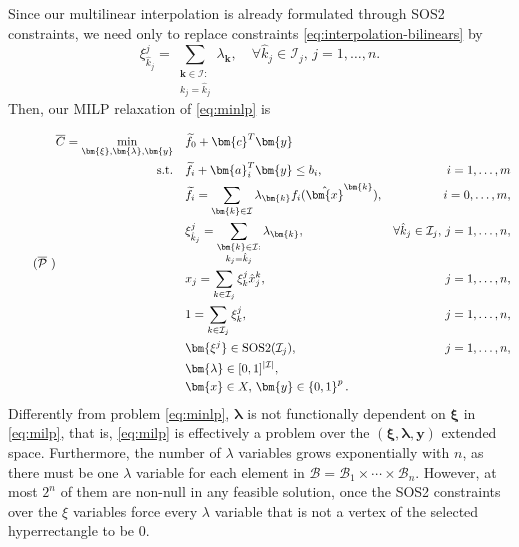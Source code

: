 \documentclass[pdflatex,sn-mathphys-num]{sn-jnl}%
\newcommand{\new}[1]{#1}
\begin{document}
\new{%
Since our multilinear interpolation is already formulated through SOS2 constraints, we need only to replace constraints \eqref{eq:interpolation-bilinears} by
\begin{equation}\label{eq:relaxed-interpolation-bilinears}
     \xi^j_{\hat{k}_j} = \sum_{\substack{\bm{k} \in \mathcal{I}: \\ k_j = \hat{k}_j}} \lambda_{\bm{k}},\quad \forall \hat{k}_j\in \mathcal{I}_j,\, j=1,\ldots,n .
\end{equation}
Then, our MILP relaxation of \ref{eq:minlp} is
}
\begin{equation}\label{eq:milp}\tag{$\overline{\mathcal{P}}$ }
\begin{aligned}
    \overline{C} = \min_{\bm{\xi},\bm{\lambda},\bm{y}} \quad & \widetilde{f}_0 + \bm{c}^{T} \bm{y}  \\
    \textrm{s.t.} \quad & \widetilde{f}_i + \bm{a}_i^{T} \bm{y} \le b_i, & i=1,\ldots,m \\
			& \widetilde{f}_i = \sum_{\bm{k}\in\mathcal{I}} \lambda_{\bm{k}}  f_i(\hat{\bm{x}}^{\bm{k}}), & i=0,\ldots,m, \\
        &\xi^j_{\hat{k}_j} = \sum_{\substack{\bm{k} \in \mathcal{I}: \\ k_j = \hat{k}_j}} \lambda_{\bm{k}},& \forall \hat{k}_j\in \mathcal{I}_j,\, j=1,\ldots,n, \\
   &x_{j} = \sum_{k\in\mathcal{I}_j} \xi^j_{k} \hat{x}_{j}^{k}, &j=1,\ldots,n, \\
   &1 = \sum_{k\in\mathcal{I}_j} \xi^j_{k}, &j=1,\ldots,n, \\
      & \bm{\xi^j} \in \text{SOS2}(\mathcal{I}_j), & j=1,\ldots,n, \\
      & \bm{\lambda} \in [0,1]^{|\mathcal{I}|}, \\
      & \bm{x}\in X, \,\bm{y}\in \left\{ 0,1 \right\}^{p} 
.\end{aligned}
\end{equation}
\new{%
Differently from problem \ref{eq:minlp}, $\bm{\lambda}$ is not functionally dependent on $\bm{\xi}$ in \ref{eq:milp}, that is, \ref{eq:milp} is effectively a problem over the $(\bm{\xi},\bm{\lambda},\bm{y})$ extended space.
Furthermore, the number of $\lambda$ variables grows exponentially with $n$, as there must be one $\lambda$ variable for each element in $\mathcal{B} = \mathcal{B}_1\times \cdots \times \mathcal{B}_n$. However, at most $2^n$ of them are non-null in any feasible solution, once the SOS2 constraints over the $\xi$ variables force every $\lambda$ variable that is not a vertex of the selected hyperrectangle to be 0.
}
\end{document}
